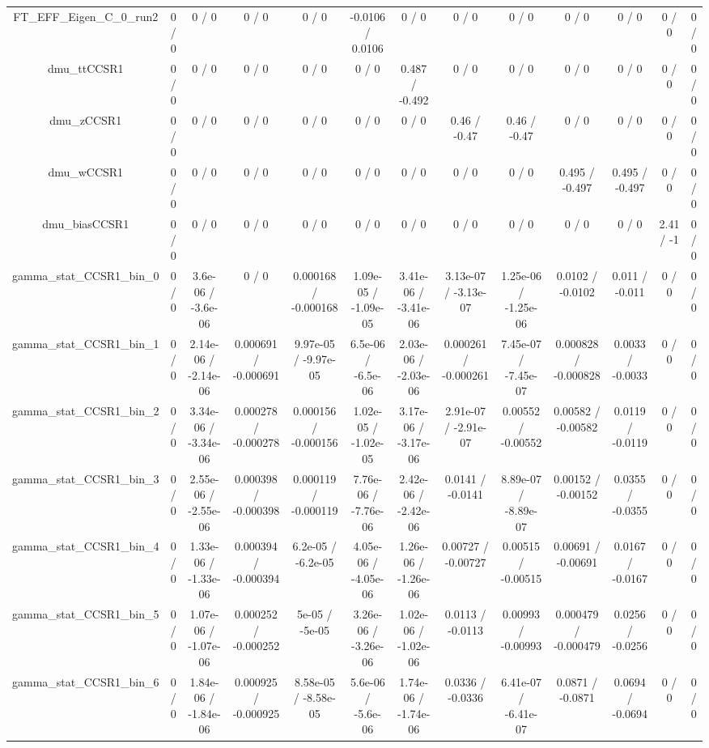 \documentclass[10pt]{article}
\begin{document}
\begin{table}[htbp]
\begin{center}
\begin{tabular}{|c|c|c|c|c|c|c|c|c|c|c|c|c|}
  FT_EFF_Eigen_C_0_run2 & 0 / 0 & 0 / 0 & 0 / 0 & 0 / 0 & -0.0106 / 0.0106 & 0 / 0 & 0 / 0 & 0 / 0 & 0 / 0 & 0 / 0 & 0 / 0 & 0 / 0 \\ 
  dmu_ttCCSR1 & 0 / 0 & 0 / 0 & 0 / 0 & 0 / 0 & 0 / 0 & 0.487 / -0.492 & 0 / 0 & 0 / 0 & 0 / 0 & 0 / 0 & 0 / 0 & 0 / 0 \\ 
  dmu_zCCSR1 & 0 / 0 & 0 / 0 & 0 / 0 & 0 / 0 & 0 / 0 & 0 / 0 & 0.46 / -0.47 & 0.46 / -0.47 & 0 / 0 & 0 / 0 & 0 / 0 & 0 / 0 \\ 
  dmu_wCCSR1 & 0 / 0 & 0 / 0 & 0 / 0 & 0 / 0 & 0 / 0 & 0 / 0 & 0 / 0 & 0 / 0 & 0.495 / -0.497 & 0.495 / -0.497 & 0 / 0 & 0 / 0 \\ 
  dmu_biasCCSR1 & 0 / 0 & 0 / 0 & 0 / 0 & 0 / 0 & 0 / 0 & 0 / 0 & 0 / 0 & 0 / 0 & 0 / 0 & 0 / 0 & 2.41 / -1 & 0 / 0 \\ 
  gamma_stat_CCSR1_bin_0 & 0 / 0 & 3.6e-06 / -3.6e-06 & 0 / 0 & 0.000168 / -0.000168 & 1.09e-05 / -1.09e-05 & 3.41e-06 / -3.41e-06 & 3.13e-07 / -3.13e-07 & 1.25e-06 / -1.25e-06 & 0.0102 / -0.0102 & 0.011 / -0.011 & 0 / 0 & 0 / 0 \\ 
  gamma_stat_CCSR1_bin_1 & 0 / 0 & 2.14e-06 / -2.14e-06 & 0.000691 / -0.000691 & 9.97e-05 / -9.97e-05 & 6.5e-06 / -6.5e-06 & 2.03e-06 / -2.03e-06 & 0.000261 / -0.000261 & 7.45e-07 / -7.45e-07 & 0.000828 / -0.000828 & 0.0033 / -0.0033 & 0 / 0 & 0 / 0 \\ 
  gamma_stat_CCSR1_bin_2 & 0 / 0 & 3.34e-06 / -3.34e-06 & 0.000278 / -0.000278 & 0.000156 / -0.000156 & 1.02e-05 / -1.02e-05 & 3.17e-06 / -3.17e-06 & 2.91e-07 / -2.91e-07 & 0.00552 / -0.00552 & 0.00582 / -0.00582 & 0.0119 / -0.0119 & 0 / 0 & 0 / 0 \\ 
  gamma_stat_CCSR1_bin_3 & 0 / 0 & 2.55e-06 / -2.55e-06 & 0.000398 / -0.000398 & 0.000119 / -0.000119 & 7.76e-06 / -7.76e-06 & 2.42e-06 / -2.42e-06 & 0.0141 / -0.0141 & 8.89e-07 / -8.89e-07 & 0.00152 / -0.00152 & 0.0355 / -0.0355 & 0 / 0 & 0 / 0 \\ 
  gamma_stat_CCSR1_bin_4 & 0 / 0 & 1.33e-06 / -1.33e-06 & 0.000394 / -0.000394 & 6.2e-05 / -6.2e-05 & 4.05e-06 / -4.05e-06 & 1.26e-06 / -1.26e-06 & 0.00727 / -0.00727 & 0.00515 / -0.00515 & 0.00691 / -0.00691 & 0.0167 / -0.0167 & 0 / 0 & 0 / 0 \\ 
  gamma_stat_CCSR1_bin_5 & 0 / 0 & 1.07e-06 / -1.07e-06 & 0.000252 / -0.000252 & 5e-05 / -5e-05 & 3.26e-06 / -3.26e-06 & 1.02e-06 / -1.02e-06 & 0.0113 / -0.0113 & 0.00993 / -0.00993 & 0.000479 / -0.000479 & 0.0256 / -0.0256 & 0 / 0 & 0 / 0 \\ 
  gamma_stat_CCSR1_bin_6 & 0 / 0 & 1.84e-06 / -1.84e-06 & 0.000925 / -0.000925 & 8.58e-05 / -8.58e-05 & 5.6e-06 / -5.6e-06 & 1.74e-06 / -1.74e-06 & 0.0336 / -0.0336 & 6.41e-07 / -6.41e-07 & 0.0871 / -0.0871 & 0.0694 / -0.0694 & 0 / 0 & 0 / 0 \\ 

\end{tabular}
\end{center}
\end{table}
\end{document}
